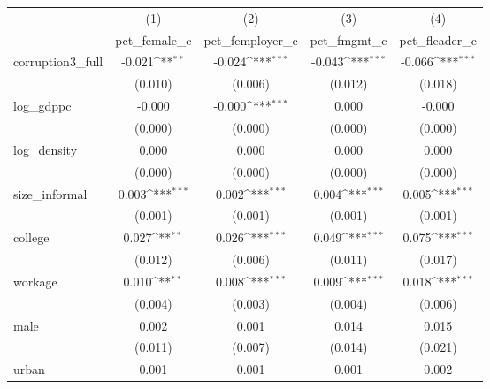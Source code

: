 {
\def\sym#1{\ifmmode^{#1}\else\(^{#1}\)\fi}
\begin{tabular}{l*{4}{c}}
\hline\hline
            &\multicolumn{1}{c}{(1)}&\multicolumn{1}{c}{(2)}&\multicolumn{1}{c}{(3)}&\multicolumn{1}{c}{(4)}\\
            &\multicolumn{1}{c}{pct\_female\_c}&\multicolumn{1}{c}{pct\_femployer\_c}&\multicolumn{1}{c}{pct\_fmgmt\_c}&\multicolumn{1}{c}{pct\_fleader\_c}\\
\hline
corruption3\_full&      -0.021\sym{**} &      -0.024\sym{***}&      -0.043\sym{***}&      -0.066\sym{***}\\
            &     (0.010)         &     (0.006)         &     (0.012)         &     (0.018)         \\
[1em]
log\_gdppc   &      -0.000         &      -0.000\sym{***}&       0.000         &      -0.000         \\
            &     (0.000)         &     (0.000)         &     (0.000)         &     (0.000)         \\
[1em]
log\_density &       0.000         &       0.000         &       0.000         &       0.000         \\
            &     (0.000)         &     (0.000)         &     (0.000)         &     (0.000)         \\
[1em]
size\_informal&       0.003\sym{***}&       0.002\sym{***}&       0.004\sym{***}&       0.005\sym{***}\\
            &     (0.001)         &     (0.001)         &     (0.001)         &     (0.001)         \\
[1em]
college     &       0.027\sym{**} &       0.026\sym{***}&       0.049\sym{***}&       0.075\sym{***}\\
            &     (0.012)         &     (0.006)         &     (0.011)         &     (0.017)         \\
[1em]
workage     &       0.010\sym{**} &       0.008\sym{***}&       0.009\sym{***}&       0.018\sym{***}\\
            &     (0.004)         &     (0.003)         &     (0.004)         &     (0.006)         \\
[1em]
male        &       0.002         &       0.001         &       0.014         &       0.015         \\
            &     (0.011)         &     (0.007)         &     (0.014)         &     (0.021)         \\
[1em]
urban       &       0.001         &       0.001         &       0.001         &       0.002         \\

\end{tabular}}
